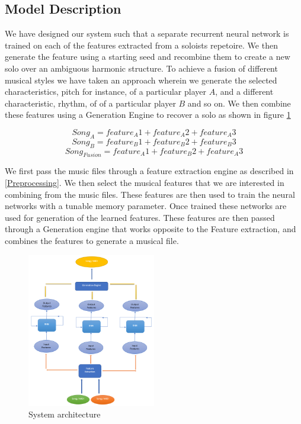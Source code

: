 \documentclass[conference]{IEEEtran}
\begin{document}
\subsection{Model Description} \label{Model description}
We have designed our system such that a separate recurrent neural network is trained on each of the features extracted from a soloists repetoire. We then generate the feature using a starting seed and recombine them to create a new solo over an ambiguous harmonic structure. To achieve a fusion of different musical styles we have taken an approach wherein we generate the selected characteristics, pitch for instance, of a particular player $A$, and a different characteristic, rhythm, of of a particular player $B$ and so on. We then combine these features using a Generation Engine to recover a solo as shown in figure \ref{fig:figure9}

$$ Song_A = feature_A{1} + feature_A{2} + feature_A{3}$$
$$ Song_B = feature_B{1} + feature_B{2} + feature_B{3}$$
$$ Song_{Fusion} = feature_A{1} + feature_B{2} + feature_A{3}$$

We first pass the music files through a feature extraction engine as described in \ref{Preprocessing}. We then select the musical features that we are interested in combining from the music files. These features are then used to train the neural networks with a tunable memory parameter. Once trained these networks are used for generation of the learned features. These features are then passed through a Generation engine that works opposite to the Feature extraction, and combines the features to generate a musical file.

\begin{figure}[h]
\includegraphics[width=0.5\textwidth]{IEEEtran/2.PNG}
\caption{System architecture}
\label{fig:figure9}
\end{figure}
\end{document}
